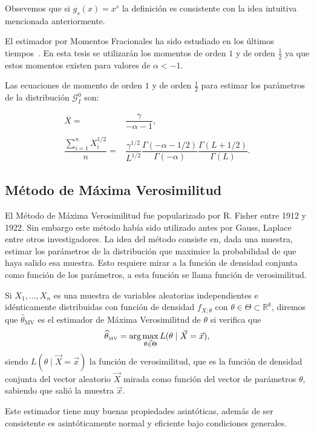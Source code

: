 Obsevemos que si $g_s(x)=x^s$ la definición es consistente con la idea intuitiva mencionada anteriormente.
%

El estimador por Momentos Fracionales ha sido estudiado en los últimos tiempos~\cite{Frery97,GambiniSC08,Khan2013}. En esta tesis se utilizarán los momentos de orden $1$ y de orden $\frac{1}{2}$ ya que estos momentos existen para valores de $\alpha<-1$.

Las ecuaciones de momento de orden $1$ y de orden $\frac{1}{2}$ para estimar los parámetros de la distribución $\mathcal G_I^0$ son:

\begin{align}
\label{momento1medio}
\nonumber \overline{X}=&\dfrac{\gamma}{-\alpha - 1}, \\
\nonumber \\ 
\dfrac{\sum_{i=1}^n X_i^{1/2}}{n}=&\dfrac{\gamma^{1/2}}{L^{1/2}}\dfrac{\Gamma(-\alpha - 1/2)}{\Gamma(-\alpha)}\dfrac{\Gamma(L+ 1/2)}{\Gamma(L)}.
\end{align}


\subsection{Método de Máxima Verosimilitud}


 El Método de Máxima Verosimilitud fue popularizado por R. Fisher entre 1912 y 1922. Sin embargo este método había sido utilizado antes por Gauss, Laplace entre otros investigadores. La idea del método consiste en, dada una muestra, estimar los parámetros de la distribución que maximice la probabilidad de que haya salido esa muestra. Esto requiere mirar a la función de densidad conjunta como función de los parámetros, a esta función se llama función de verosimilitud.
\begin{definition}
Si $X_1, \ldots, X_n$ es una muestra de variables aleatorias independientes e idénticamente distribuidas con función de densidad $f_{X;\theta}$  con $\theta \in \Theta \subset \mathbb{R}^k$, diremos que $\widehat{\theta}_{\text{MV}}$ es el estimador de Máxima Verosimilitud de $\theta$ si verifica que 
\begin{align}
\widehat{\theta}_{{\text{\tiny{\text{MV}}}}}=\arg\max_{\vec{\theta \in \Theta}} L(\theta \mid \vec{X}=\vec{x}),
\end{align}
siendo $L(\theta \mid \vec{X}=\vec{x})$ la función de verosimilitud, que es la función de densidad conjunta del vector aleatorio $\vec{X}$ mirada como función del vector de parámetros $\theta$, sabiendo que salió la muestra $\vec{x}$.
\end{definition}
Este estimador tiene muy buenas propiedades asintóticas, además de ser consistente es asintóticamente normal y eficiente bajo condiciones generales.


